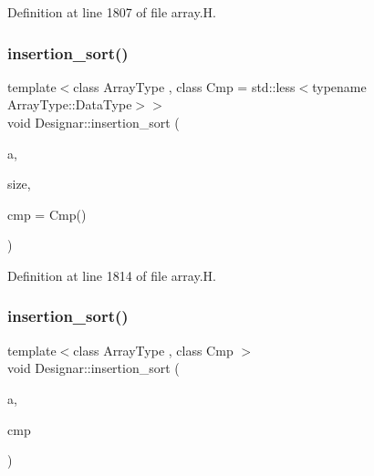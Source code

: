 Definition at line 1807 of file array.\+H.

\mbox{\label{namespace_designar_a8655d6fa8772dee92565bf7475e5612d}} 
\subsubsection{\texorpdfstring{insertion\+\_\+sort()}{insertion\_sort()}\hspace{0.1cm}{\footnotesize\ttfamily [4/6]}}
{\footnotesize\ttfamily template$<$class Array\+Type , class Cmp  = std\+::less$<$typename Array\+Type\+::\+Data\+Type$>$$>$ \\
void Designar\+::insertion\+\_\+sort (\begin{DoxyParamCaption}\item[{Array\+Type \&}]{a,  }\item[{\hyperlink{namespace_designar_a9d113d66a39e82b73727c72cd3a52f73}{lint\+\_\+t}}]{size,  }\item[{Cmp \&\&}]{cmp = {\ttfamily Cmp()} }\end{DoxyParamCaption})\hspace{0.3cm}{\ttfamily [inline]}}



Definition at line 1814 of file array.\+H.

\mbox{\label{namespace_designar_ab78e23e3c8eb0365e27244f5de2532d2}} 
\subsubsection{\texorpdfstring{insertion\+\_\+sort()}{insertion\_sort()}\hspace{0.1cm}{\footnotesize\ttfamily [5/6]}}
{\footnotesize\ttfamily template$<$class Array\+Type , class Cmp $>$ \\
void Designar\+::insertion\+\_\+sort (\begin{DoxyParamCaption}\item[{Array\+Type \&}]{a,  }\item[{Cmp \&}]{cmp }\end{DoxyParamCaption})\hspace{0.3cm}{\ttfamily [inline]}}



